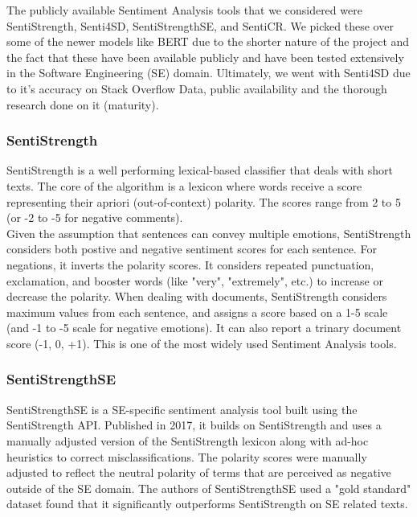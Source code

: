 \documentclass[conference]{IEEEtran}
\begin{document}
The publicly available Sentiment Analysis tools that we considered were SentiStrength, Senti4SD, SentiStrengthSE, and SentiCR\cite{b16, b18, b19, b20}. We picked these over some of the newer models like BERT\cite{b22} due to the shorter nature of the project and the fact that these have been available publicly and have been tested extensively in the Software Engineering (SE) domain. Ultimately, we went with Senti4SD due to it's accuracy on Stack Overflow Data, public availability and the thorough research done on it (maturity).\\

\subsubsection{SentiStrength}
SentiStrength is a well performing lexical-based classifier that deals with short texts. The core of the algorithm is a lexicon where words receive a score representing their apriori (out-of-context) polarity. The scores range from 2 to 5 (or -2 to -5 for negative comments). \\

Given the assumption that sentences can convey multiple emotions, SentiStrength considers both postive and negative sentiment scores for each sentence. For negations, it inverts the polarity scores. It considers repeated punctuation, exclamation, and booster words (like "very", "extremely", etc.) to increase or decrease the polarity. When dealing with documents, SentiStrength considers maximum values from each sentence, and assigns a score based on a 1-5 scale (and -1 to -5 scale for negative emotions). It can also report a trinary document score (-1, 0, +1). This is one of the most widely used Sentiment Analysis tools.\cite{b16, b21}\\

\subsubsection{SentiStrengthSE}
SentiStrengthSE is a SE-specific sentiment analysis tool built using the SentiStrength API\cite{b20}. Published in 2017, it builds on SentiStrength and uses a manually adjusted version of the SentiStrength lexicon along with ad-hoc heuristics to correct misclassifications. The polarity scores were manually adjusted to reflect the neutral polarity of terms that are perceived as negative outside of the SE domain. The authors of SentiStrengthSE used a "gold standard" dataset\cite{b23} found that it significantly outperforms SentiStrength on SE related texts\cite{b20}.\\
\end{document}
